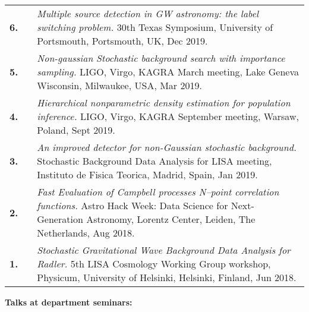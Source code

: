 {\begin{longtable}{rp{0.3cm}p{15.8cm}}
%
\textbf{6.} &  & \textit{Multiple source detection in GW astronomy: the label switching problem.}
\newline{}
30th Texas Symposium, University of Portsmouth, Portsmouth, UK, Dec 2019.
\vspace{0.05cm}\\
%
\textbf{5.} &  & \textit{Non-gaussian Stochastic background search with importance sampling.}
\newline{}
LIGO, Virgo, KAGRA March meeting, Lake Geneva Wisconsin, Milwaukee, USA, Mar 2019.
\vspace{0.05cm}\\
%
\textbf{4.} &  & \textit{Hierarchical nonparametric density estimation for population inference.}
\newline{}
LIGO, Virgo, KAGRA September meeting, Warsaw, Poland, Sept 2019.
\vspace{0.05cm}\\
%
\textbf{3.} &  & \textit{An improved detector for non-Gaussian stochastic background.}
\newline{}
Stochastic Background Data Analysis for LISA meeting, Instituto de Fisica Teorica, Madrid, Spain, Jan 2019.
\vspace{0.05cm}\\
%
\textbf{2.} &  & \textit{Fast Evaluation of Campbell processes N–point correlation functions.}
\newline{}
Astro Hack Week: Data Science for Next-Generation Astronomy, Lorentz Center, Leiden, The Netherlands, Aug 2018.
\vspace{0.05cm}\\
%
\textbf{1.} &  & \textit{Stochastic Gravitational Wave Background Data Analysis for Radler.}
\newline{}
5th LISA Cosmology Working Group workshop, Physicum, University of Helsinki, Helsinki, Finland, Jun 2018.
\vspace{0.05cm}\\
%
\end{longtable} }
\textcolor{color1}{\textbf{Talks at department seminars:}}
\vspace{-0.5cm}

